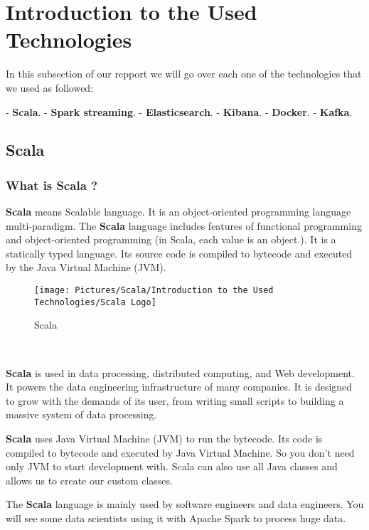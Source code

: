 \chapter*{Introduction to the Used Technologies}
\begin{spacing}{1.5}

\par In this subsection of our repport we will go over each one of the technologies that we used as followed:

- \textbf{Scala}.
- \textbf{Spark streaming}.
- \textbf{Elasticsearch}.
- \textbf{Kibana}.
- \textbf{Docker}.
- \textbf{Kafka}.
\section{Scala}
\subsection{What is Scala ?}
\par  \textbf{Scala} means Scalable language. It is an object-oriented programming language multi-paradigm. The \textbf{Scala} language includes features of functional programming and object-oriented programming (in Scala, each value is an object.). It is a statically typed language. Its source code is compiled to bytecode and executed by the Java Virtual Machine (JVM).
\begin{figure}[!htb] 
\begin{center} 
\texttt{[image: Pictures/Scala/Introduction to the Used Technologies/Scala Logo]}
\end{center} 
\caption{Scala} 
\end{figure}  \FloatBarrier
\\
\par  \textbf{Scala} is used in data processing, distributed computing, and Web development. It powers the data engineering infrastructure of many companies. It is designed to grow with the demands of its user, from writing small scripts to building a massive system of data processing.
\\ 
\par  \textbf{Scala} uses Java Virtual Machine (JVM) to run the bytecode. Its code is compiled to bytecode and executed by Java Virtual Machine. So you don't need only JVM to start development with.
Scala can also use all Java classes and allows us to create our custom classes.
\\
\par The \textbf{Scala} language is mainly used by software engineers and data engineers. You will see some data scientists using it with Apache Spark to process huge data.



\end{spacing}
